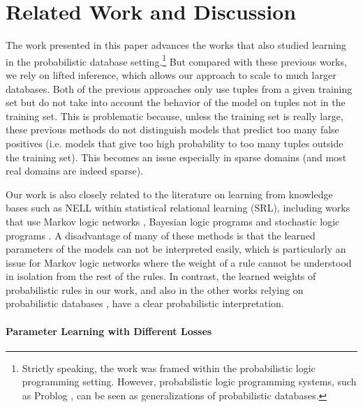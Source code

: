 \documentclass[akbc,twoside,11pt]{article}
\newcommand{\guy}[1]{\textcolor{red}{G: {#1}}}
\begin{document}
\section{Related Work and Discussion}
\label{sec:related}
The work presented in this paper advances the works \cite{DBLP:conf/ijcai/RaedtDTBV15,theobald_learning} that also studied learning in the probabilistic database setting.\footnote{Strictly speaking, the work \cite{DBLP:conf/ijcai/RaedtDTBV15} was framed within the probabilistic logic programming setting. However, probabilistic logic programming systems, such as Problog \cite{fierens2015inference}, can be seen as generalizations of probabilistic databases.} 
But compared with these previous works, we rely on lifted inference, which allows our approach to scale to much larger databases. %
Both of the previous approaches only use tuples from a given training set but do not take into account the behavior of the model on tuples not in the training set. 
This is problematic %
because, unless the training set is really large, these previous methods do not distinguish models that predict too many false positives (i.e. models that give too high probability to too many tuples outside the training set). This becomes an issue especially in sparse domains (and most real domains are indeed sparse).

Our work is also closely related to the literature on learning from knowledge bases such as NELL within statistical relational learning (SRL), including works that use Markov logic networks \cite{DBLP:conf/emnlp/SchoenmackersDEW10}, Bayesian logic programs \cite{raghavan2012learning} and stochastic logic programs \cite{lao2011random,wang2014structure}. A disadvantage of many of these methods is that the learned parameters of the models can not be interpreted easily, which is particularly an issue for Markov logic networks where the weight of a rule cannot be understood in isolation from the rest of the rules. In contrast, the learned weights of probabilistic rules in our work, and also in the other works relying on probabilistic databases \cite{DBLP:conf/ijcai/RaedtDTBV15,theobald_learning}, have a clear probabilistic interpretation.

\paragraph{Parameter Learning with Different Losses}
\end{document}
